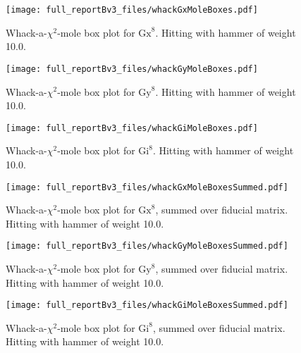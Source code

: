 {\begin{figure}
\begin{center}
\texttt{[image: full\_reportBv3\_files/whackGxMoleBoxes.pdf]}
\caption{Whack-a-$\chi^2$-mole box plot for $\mathrm{Gx}^{8}$.  Hitting with hammer of weight 10.0.\label{WhackGxMoleBoxPlot}}
\end{center}
\end{figure}

\begin{figure}
\begin{center}
\texttt{[image: full\_reportBv3\_files/whackGyMoleBoxes.pdf]}
\caption{Whack-a-$\chi^2$-mole box plot for $\mathrm{Gy}^{8}$.  Hitting with hammer of weight 10.0.\label{WhackGyMoleBoxPlot}}
\end{center}
\end{figure}

\begin{figure}
\begin{center}
\texttt{[image: full\_reportBv3\_files/whackGiMoleBoxes.pdf]}
\caption{Whack-a-$\chi^2$-mole box plot for $\mathrm{Gi}^{8}$.  Hitting with hammer of weight 10.0.\label{WhackGiMoleBoxPlot}}
\end{center}
\end{figure}

\begin{figure}
\begin{center}
\texttt{[image: full\_reportBv3\_files/whackGxMoleBoxesSummed.pdf]}
\caption{Whack-a-$\chi^2$-mole box plot for $\mathrm{Gx}^{8}$, summed over fiducial matrix.  Hitting with hammer of weight 10.0.\label{WhackGxMoleBoxPlotSummed}}
\end{center}
\end{figure}

\begin{figure}
\begin{center}
\texttt{[image: full\_reportBv3\_files/whackGyMoleBoxesSummed.pdf]}
\caption{Whack-a-$\chi^2$-mole box plot for $\mathrm{Gy}^{8}$, summed over fiducial matrix.  Hitting with hammer of weight 10.0.\label{WhackGyMoleBoxPlotSummed}}
\end{center}
\end{figure}

\begin{figure}
\begin{center}
\texttt{[image: full\_reportBv3\_files/whackGiMoleBoxesSummed.pdf]}
\caption{Whack-a-$\chi^2$-mole box plot for $\mathrm{Gi}^{8}$, summed over fiducial matrix.  Hitting with hammer of weight 10.0.\label{WhackGiMoleBoxPlotSummed}}
\end{center}
\end{figure}

}{}
